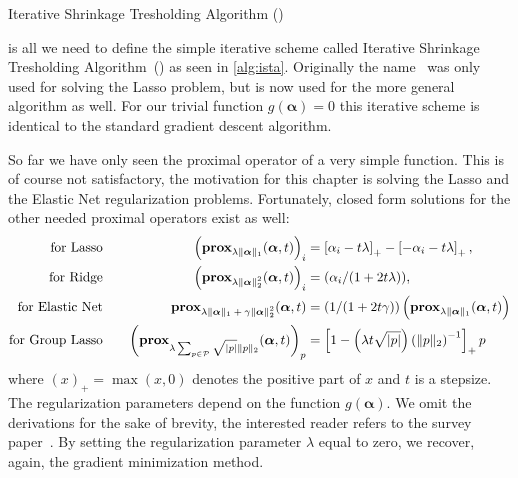 \begin{algorithm}
 \caption{Iterative Shrinkage Tresholding Algorithm (\ista)~\cite{fista}}\label{alg:ista} 
 \begin{algorithmic}[1]
    \Statex
     
      \EndWhile
     \State \Return{\(\bm{\alpha}\)}
    \EndFunction
\end{algorithmic}
\end{algorithm}

 is all we need to define the simple iterative scheme called
Iterative Shrinkage Tresholding Algorithm~(\ista) as seen in \cref{alg:ista}.
Originally the name \ista\ was only used for solving the Lasso problem, but is now used for the more general algorithm as well. 
For our trivial function \(g(\bm{\alpha}) = 0\) this iterative scheme is identical to the standard gradient descent algorithm.

So far we have only seen the proximal operator of a very simple function.
This is of course not satisfactory, the motivation for this chapter is solving the Lasso and the Elastic Net regularization problems.
Fortunately, closed form solutions for the other needed proximal operators exist as well:
\begin{align}
\label{eq:prox-lasso}
\text{for Lasso} \quad &&
    \left( \prox[\(\lambda \Vert \bm{\alpha} \Vert_1\)]{\bm{\alpha}}{t} \right)_i &= \left[\alpha_i - t \lambda \right]_+
    - \left[ -\alpha_i - t \lambda \right]_+, \\
\text{for Ridge} \quad &&
                          \left(  \prox[\( \lambda \Vert \bm{\alpha} \Vert_2^2\)]{\bm{\alpha}}{t} \right)_i &= (\alpha_i/(1 + 2t \lambda)), \nonumber\\
  \text{for Elastic Net} \quad && \prox[\( \lambda \Vert \bm{\alpha} \Vert_1 + \gamma \Vert \bm{\alpha} \Vert_2^2\)]{\bm{\alpha}}{t} &=
                                                                                                                                       \left( 1/(1 + 2 t \gamma) \right) \left(\prox[\(\lambda \Vert \bm{\alpha} \Vert_1\)]{\bm{\alpha}}{t}\right) \nonumber\\
  \text{for Group Lasso} \quad && {\left(\prox[\( \lambda \sum_{p \in \mathcal{P}} \sqrt{\vert p \vert} \Vert p \Vert_2 \)]{\bm{\alpha}}{t} \right)}_p &=
                                                                                     \left[ 1 - \left(\lambda t \sqrt{\vert p \vert}\right) \left( \Vert p \Vert_2 \right)^{-1} \right]_+ p \nonumber
\end{align}
where \( \left( x \right)_+ = \max(x, 0) \) denotes the positive part of \(x\)
and \(t\) is a stepsize.
The regularization parameters depend on the function \(g(\bm{\alpha})\).
We omit the derivations for the sake of brevity, the interested reader refers to the survey paper~\cite{proxsurvey}.
By setting the regularization parameter \(\lambda\) equal to zero, we recover, again, the gradient minimization method.

